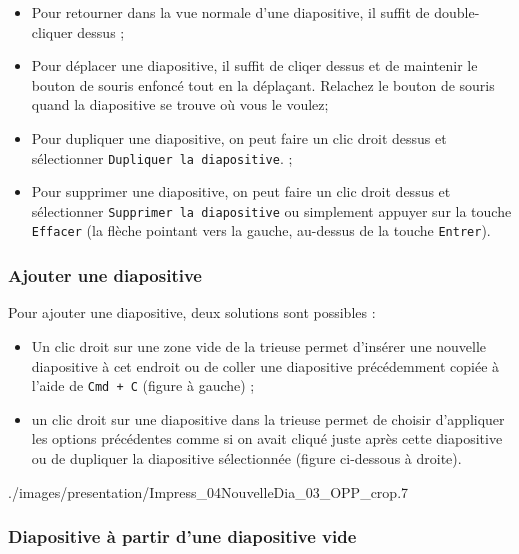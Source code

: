 
\begin{itemize}
	\item Pour retourner dans la vue normale d'une diapositive, il suffit de double-cliquer dessus ;
	\item Pour déplacer une diapositive, il suffit de cliqer dessus et de maintenir le bouton de souris enfoncé tout en la déplaçant. Relachez le bouton de souris quand la diapositive se trouve où vous le voulez;
	\item Pour dupliquer une diapositive, on peut faire un clic droit dessus et sélectionner \texttt{Dupliquer la diapositive}. ;
	\item Pour supprimer une diapositive, on peut faire un clic droit dessus et sélectionner \texttt{Supprimer la diapositive} ou simplement appuyer sur la touche \texttt{Effacer} (la flèche pointant vers la gauche, au-dessus de la touche \texttt{Entrer}).
\end{itemize}




\subsubsection{Ajouter une diapositive}\label{Presentation1nouvelleDiap}

Pour ajouter une diapositive, deux solutions sont possibles :

\begin{itemize}
\item Un clic droit sur une zone vide de la trieuse permet d'insérer une nouvelle diapositive à cet endroit ou de coller une diapositive précédemment copiée à l'aide de \texttt{Cmd + C} (figure à gauche) ; 
\item un clic droit sur une diapositive dans la trieuse permet de choisir d'appliquer les options précédentes comme si on avait cliqué juste après cette diapositive ou de dupliquer la diapositive sélectionnée (figure ci-dessous à droite).
\end{itemize}
	
	      {./images/presentation/Impress_04NouvelleDia_03_OPP_crop}{.7\textwidth}



\subsubsection{Diapositive à partir d'une diapositive vide}\label{Presentation1DiapoSansModele}


